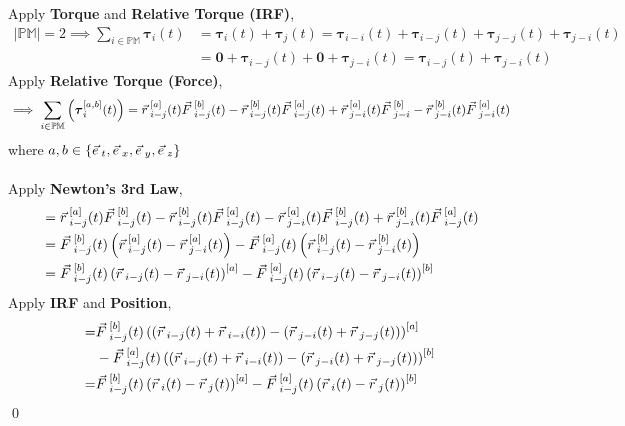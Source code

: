 \documentclass[12pt]{amsart}
\renewenvironment{proof}{{\bfseries Proof.}}{\qed}
\let\oldvec\vec
\renewcommand{\vec}[1]{\oldvec{#1}\hspace{0.1em}}
\begin{document}
\begin{proof}
    Apply \textbf{Torque} and \textbf{Relative Torque (IRF)},
    \begin{align*}
    \left | \mathbb{PM} \right | = 2 \implies \displaystyle \sum_{i \in \mathbb{PM}} \boldsymbol{\tau}_{i} (t) & = \boldsymbol{\tau}_{i} (t)+\boldsymbol{\tau}_{j} (t) = \boldsymbol{\tau}_{i-i} (t) + \boldsymbol{\tau}_{i-j} (t)  + \boldsymbol{\tau}_{j-j} (t)+\boldsymbol{\tau}_{j-i} (t) \\
    &  = \boldsymbol{0} + \boldsymbol{\tau}_{i-j} (t)  + \boldsymbol{0}+\boldsymbol{\tau}_{j-i} (t)= \boldsymbol{\tau}_{i-j} (t) + \boldsymbol{\tau}_{j-i} (t)
    \end{align*}
    Apply \textbf{Relative Torque (Force)},
    $$ \implies \displaystyle \sum_{i \in \mathbb{PM}} \left ( \boldsymbol{\tau}_{i} ^{[a,b]} (t) \right ) = \vec{r}^{[a]}_{i-j} (t)\vec{F}^{[b]}_{i-j} (t) - \vec{r}^{[b]}_{i-j} (t) \vec{F}^{[a]}_{i-j} (t) + \vec{r}^{[a]}_{j-i} (t)\vec{F}^{[b]}_{j-i} - \vec{r}^{[b]}_{j-i} (t) \vec{F}^{[a]}_{j-i} (t) $$
    where $a, b \in \{ \vec{e}_t, \vec{e}_x, \vec{e}_y, \vec{e}_z \}$
    \\\\
    Apply \textbf{Newton's 3rd Law},
    \begin{align*} &= \vec{r}^{[a]}_{i-j} (t)\vec{F}^{[b]}_{i-j} (t) - \vec{r}^{[b]}_{i-j} (t) \vec{F}^{[a]}_{i-j} (t) - \vec{r}^{[a]}_{j-i} (t)\vec{F}^{[b]}_{i-j} (t) + \vec{r}^{[b]}_{j-i} (t) \vec{F}^{[a]}_{i-j} (t)\\
    &= \vec{F}^{[b]}_{i-j} (t) \left ( \vec{r}^{[a]}_{i-j} (t) - \vec{r}^{[a]}_{j-i} (t) \right ) -  \vec{F}^{[a]}_{i-j} (t) \left ( \vec{r}^{[b]}_{i-j} (t) - \vec{r}^{[b]}_{j-i} (t)  \right )\\
    &= \vec{F}^{[b]}_{i-j} (t) \left ( \vec{r}_{i-j} (t) - \vec{r}_{j-i} (t) \right )^{[a]} -  \vec{F}^{[a]}_{i-j} (t) \left ( \vec{r}_{i-j} (t) - \vec{r}_{j-i} (t)  \right )^{[b]}
    \end{align*}
    Apply \textbf{IRF} and \textbf{Position},
    \begin{align*}
    =& \vec{F}^{[b]}_{i-j} (t) \left ( (\vec{r}_{i-j} (t) + \vec{r}_{i-i} (t)) - (\vec{r}_{j-i} (t) +\vec{r}_{j-j} (t)) \right )^{[a]} \\
    &- \vec{F}^{[a]}_{i-j} (t) \left ( (\vec{r}_{i-j} (t)+ \vec{r}_{i-i} (t)) - (\vec{r}_{j-i} (t)+\vec{r}_{j-j} (t) ) \right )^{[b]}\\
    =& \vec{F}^{[b]}_{i-j} (t) \left ( \vec{r}_{i} (t) - \vec{r}_{j} (t) \right )^{[a]} -  \vec{F}^{[a]}_{i-j} (t) \left ( \vec{r}_{i} (t) - \vec{r}_{j} (t)  \right )^{[b]}

\end{align*}
\end{proof}
\end{document}
